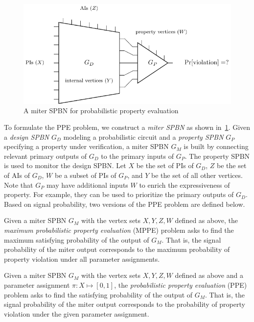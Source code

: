 \begin{figure}[t]
    \centering
    \includegraphics{fig/build/prob-spbn-miter.pdf}
    \caption{A miter SPBN for probabilistic property evaluation}
    \label{fig:prob-spbn-miter}
\end{figure}

To formulate the PPE problem,
we construct a \textit{miter SPBN} as shown in~\cref{fig:prob-spbn-miter}.
Given a \textit{design SPBN} $G_D$ modeling a probabilistic circuit and
a \textit{property SPBN} $G_P$ specifying a property under verification,
a miter SPBN $G_M$ is built by connecting relevant primary outputs of $G_D$ to the primary inputs of $G_P$.
The property SPBN is used to monitor the design SPBN.
Let $X$ be the set of PIs of $G_D$,
$Z$ be the set of AIs of $G_D$,
$W$ be a subset of PIs of $G_P$,
and $Y$ be the set of all other vertices.
Note that $G_P$ may have additional inputs $W$ to enrich the expressiveness of property.
For example, they can be used to prioritize the primary outputs of $G_D$.
Based on signal probability,
two versions of the PPE problem are defined below.

\begin{definition}
    Given a miter SPBN $G_M$ with the vertex sets $X,Y,Z,W$ defined as above,
    the \textit{maximum probabilistic property evaluation} (MPPE) problem asks to find the maximum satisfying probability of the output of $G_M$.
    That is,
    the signal probability of the miter output corresponds to the maximum probability of property violation under all parameter assignments.
\end{definition}

\begin{definition}
    Given a miter SPBN $G_M$ with the vertex sets $X,Y,Z,W$ defined as above and a parameter assignment $\pi:X\mapsto[0,1]$,
    the \textit{probabilistic property evaluation} (PPE) problem asks to find the satisfying probability of the output of $G_M$.
    That is,
    the signal probability of the miter output corresponds to the probability of property violation under the given parameter assignment.
\end{definition}

